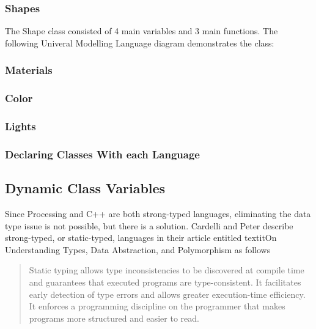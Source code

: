 \subsubsection{Shapes}
The Shape class consisted of 4 main variables and 3 main functions. The following Univeral Modelling Language diagram demonstrates the class:

\subsubsection{Materials}
\subsubsection{Color}
\subsubsection{Lights}
\subsubsection{Declaring Classes With each Language}
\subsection{Dynamic Class Variables}
Since Processing and C++ are both strong-typed languages, eliminating the data type issue is not possible, but there is a solution.  Cardelli and Peter describe strong-typed, or static-typed, languages in their article entitled textit{On Understanding Types, Data Abstraction, and Polymorphism} as follows
\begin{quote}
Static typing allows type inconsistencies to be discovered at compile time and guarantees that executed programs are type-consistent. It facilitates early detection of type errors and allows greater execution-time efficiency. It enforces a programming discipline on the programmer that makes programs more structured and easier to read. \cite{cardelli1985understanding}
\end{quote}

